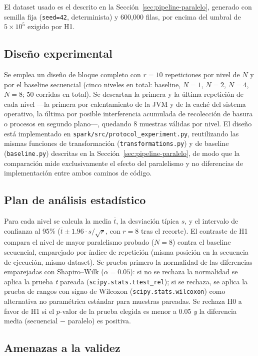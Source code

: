 \documentclass[11pt,letterpaper]{article}
\begin{document}
El dataset usado es el descrito en la Sección~\ref{sec:pipeline-paralelo}, generado con semilla
fija (\texttt{seed=42}, determinista) y 600{,}000 filas, por encima del umbral de $5 \times 10^5$
exigido por H1.

\subsection{Diseño experimental}

Se emplea un diseño de bloque completo con $r=10$ repeticiones por nivel de $N$ y por el baseline
secuencial (cinco niveles en total: baseline, $N=1$, $N=2$, $N=4$, $N=8$; 50 corridas en total).
Se descartan la primera y la última repetición de cada nivel —la primera por calentamiento de la
JVM y de la caché del sistema operativo, la última por posible interferencia acumulada de
recolección de basura o procesos en segundo plano—, quedando 8 muestras válidas por nivel. El
diseño está implementado en \texttt{spark/src/protocol\_experiment.py}, reutilizando las mismas
funciones de transformación (\texttt{transformations.py}) y de baseline (\texttt{baseline.py})
descritas en la Sección~\ref{sec:pipeline-paralelo}, de modo que la comparación mide exclusivamente
el efecto del paralelismo y no diferencias de implementación entre ambos caminos de código.

\subsection{Plan de análisis estadístico}

Para cada nivel se calcula la media $\bar{t}$, la desviación típica $s$, y el intervalo de
confianza al 95\% ($\bar{t} \pm 1.96 \cdot s/\sqrt{r}$, con $r=8$ tras el recorte). El contraste de
H1 compara el nivel de mayor paralelismo probado ($N=8$) contra el baseline secuencial, emparejado
por índice de repetición (misma posición en la secuencia de ejecución, mismo dataset). Se prueba
primero la normalidad de las diferencias emparejadas con Shapiro--Wilk ($\alpha=0.05$): si no se
rechaza la normalidad se aplica la prueba \emph{t} pareada (\texttt{scipy.stats.ttest\_rel}); si se
rechaza, se aplica la prueba de rangos con signo de Wilcoxon
(\texttt{scipy.stats.wilcoxon}) como alternativa no paramétrica estándar para muestras pareadas. Se
rechaza H0 a favor de H1 si el $p$-valor de la prueba elegida es menor a 0.05 \emph{y} la
diferencia media (secuencial $-$ paralelo) es positiva.

\subsection{Amenazas a la validez}
\end{document}
